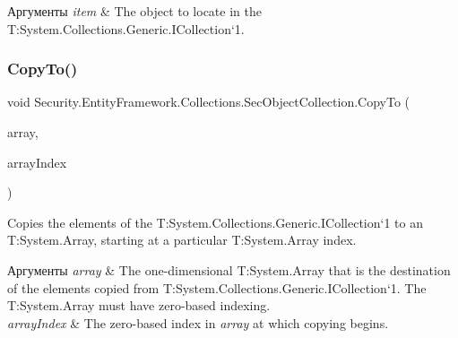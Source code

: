 \begin{DoxyParams}{Аргументы}
{\em item} & The object to locate in the T\+:\+System.\+Collections.\+Generic.\+I\+Collection`1.\\
\hline
\end{DoxyParams}
\mbox{\label{class_security_1_1_entity_framework_1_1_collections_1_1_sec_object_collection_a0226da816be691748ba51c0729196be0}} 
\subsubsection{\texorpdfstring{Copy\+To()}{CopyTo()}}
{\footnotesize\ttfamily void Security.\+Entity\+Framework.\+Collections.\+Sec\+Object\+Collection.\+Copy\+To (\begin{DoxyParamCaption}\item[{\hyperlink{interface_security_1_1_interfaces_1_1_model_1_1_i_sec_object}{I\+Sec\+Object} \mbox{[}$\,$\mbox{]}}]{array,  }\item[{int}]{array\+Index }\end{DoxyParamCaption})}



Copies the elements of the T\+:\+System.\+Collections.\+Generic.\+I\+Collection`1 to an T\+:\+System.\+Array, starting at a particular T\+:\+System.\+Array index. 


\begin{DoxyParams}{Аргументы}
{\em array} & The one-\/dimensional T\+:\+System.\+Array that is the destination of the elements copied from T\+:\+System.\+Collections.\+Generic.\+I\+Collection`1. The T\+:\+System.\+Array must have zero-\/based indexing.\\
\hline
{\em array\+Index} & The zero-\/based index in {\itshape array}  at which copying begins.\\
\hline
\end{DoxyParams}

